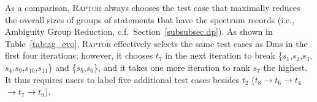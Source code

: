 As a comparison, \textsc{Raptor} always chooses the test case that maximally reduces the overall sizes of groups of statements that have the spectrum records (i.e., Ambiguity Group Reduction, c.f.\ Section~\ref{subsubsec.dp}). As shown in Table~\ref{tab:ag_evo}, \textsc{Raptor} effectively selects the same test cases as {\sc Dms} in the first four iterations; however, it chooses $t_{7}$ in the next iteration to break \{$s_{1}$,$s_{2}$,$s_{3}$,$s_{4}$,$s_{9}$,$s_{10}$,$s_{11}$\} and \{$s_{5}$,$s_{6}$\}, and it takes one more iteration to rank $s_7$ the highest.
It thus requires users to label five additional test cases besides $t_2$ (\texttt{$t_{8}$}$\rightarrow$\texttt{$t_{6}$}$\rightarrow$\texttt{$t_{4}$}$\rightarrow$\texttt{$t_{7}$}$\rightarrow$\texttt{$t_{9}$}).
